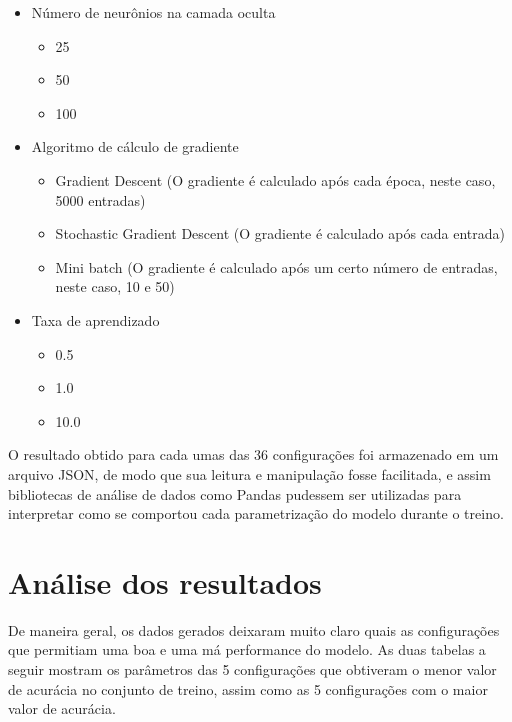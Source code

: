 \documentclass{article}
\begin{document}
\begin{itemize}
    \item Número de neurônios na camada oculta
        \begin{itemize}
            \item 25
            \item 50
            \item 100
        \end{itemize}
    \item Algoritmo de cálculo de gradiente 
        \begin{itemize}
            \item Gradient Descent (O gradiente é calculado após cada época, neste caso, 5000 entradas)
            \item Stochastic Gradient Descent (O gradiente é calculado após cada entrada)
            \item Mini batch (O gradiente é calculado após um certo número de entradas, neste caso, 10 e 50)
        \end{itemize}
    \item Taxa de aprendizado 
        \begin{itemize}
            \item 0.5
            \item 1.0
            \item 10.0
        \end{itemize}
\end{itemize}

O resultado obtido para cada umas das 36 configurações foi armazenado em um arquivo JSON, de modo que sua leitura e manipulação fosse facilitada, e assim bibliotecas de análise de dados como Pandas pudessem ser utilizadas para interpretar
como se comportou cada parametrização do modelo durante o treino.

\section{Análise dos resultados}

De maneira geral, os dados gerados deixaram muito claro quais as configurações que permitiam uma boa e uma má performance do modelo. As duas tabelas a seguir mostram os parâmetros das 5 configurações que obtiveram o menor valor de acurácia no conjunto de treino,
assim como as 5 configurações com o maior valor de acurácia.
\end{document}
